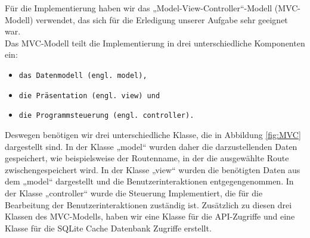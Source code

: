 \documentclass[12pt,a4paper,ngerman,english]{report}
\begin{document}
Für die Implementierung haben wir das „Model-View-Controller“-Modell (MVC-Modell) verwendet, das sich für die Erledigung unserer Aufgabe sehr geeignet war.\\
Das MVC-Modell teilt die Implementierung in drei unterschiedliche Komponenten ein:	
\begin{itemize}
	\setlength\itemsep{0.1em}
	\item \texttt{das Datenmodell (engl. model),}
	\item \texttt{die Präsentation (engl. view) und}
	\item \texttt{die Programmsteuerung (engl. controller).}
\end{itemize}
\newpage
Deswegen benötigen wir drei unterschiedliche Klasse, die in Abbildung \ref{fig:MVC} dargestellt sind. In der Klasse „model“ wurden daher die darzustellenden Daten gespeichert, wie beispielsweise der Routenname, in der die ausgewählte Route zwischengespeichert wird. In der Klasse „view“ wurden die benötigten Daten aus dem „model“ dargestellt und die Benutzerinteraktionen entgegengenommen. In der Klasse „controller“ wurde die Steuerung Implementiert, die für die Bearbeitung der Benutzerinteraktionen zuständig ist. Zusätzlich zu diesen drei Klassen des MVC-Modells, haben wir eine Klasse für die API-Zugriffe und eine Klasse für die SQLite Cache Datenbank Zugriffe erstellt.
\end{document}
